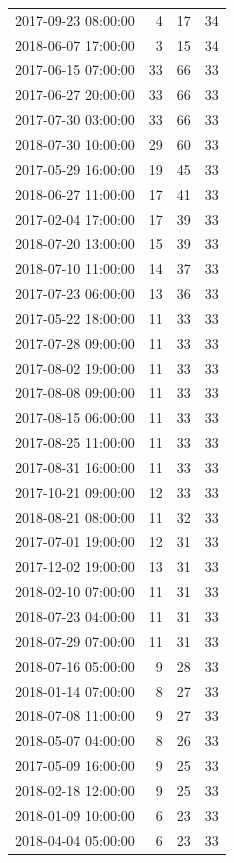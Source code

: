 \begin{tabular}{lrrr}
2017-09-23 08:00:00 & 4 & 17 & 34 \\
2018-06-07 17:00:00 & 3 & 15 & 34 \\
2017-06-15 07:00:00 & 33 & 66 & 33 \\
2017-06-27 20:00:00 & 33 & 66 & 33 \\
2017-07-30 03:00:00 & 33 & 66 & 33 \\
2018-07-30 10:00:00 & 29 & 60 & 33 \\
2017-05-29 16:00:00 & 19 & 45 & 33 \\
2018-06-27 11:00:00 & 17 & 41 & 33 \\
2017-02-04 17:00:00 & 17 & 39 & 33 \\
2018-07-20 13:00:00 & 15 & 39 & 33 \\
2018-07-10 11:00:00 & 14 & 37 & 33 \\
2017-07-23 06:00:00 & 13 & 36 & 33 \\
2017-05-22 18:00:00 & 11 & 33 & 33 \\
2017-07-28 09:00:00 & 11 & 33 & 33 \\
2017-08-02 19:00:00 & 11 & 33 & 33 \\
2017-08-08 09:00:00 & 11 & 33 & 33 \\
2017-08-15 06:00:00 & 11 & 33 & 33 \\
2017-08-25 11:00:00 & 11 & 33 & 33 \\
2017-08-31 16:00:00 & 11 & 33 & 33 \\
2017-10-21 09:00:00 & 12 & 33 & 33 \\
2018-08-21 08:00:00 & 11 & 32 & 33 \\
2017-07-01 19:00:00 & 12 & 31 & 33 \\
2017-12-02 19:00:00 & 13 & 31 & 33 \\
2018-02-10 07:00:00 & 11 & 31 & 33 \\
2018-07-23 04:00:00 & 11 & 31 & 33 \\
2018-07-29 07:00:00 & 11 & 31 & 33 \\
2018-07-16 05:00:00 & 9 & 28 & 33 \\
2018-01-14 07:00:00 & 8 & 27 & 33 \\
2018-07-08 11:00:00 & 9 & 27 & 33 \\
2018-05-07 04:00:00 & 8 & 26 & 33 \\
2017-05-09 16:00:00 & 9 & 25 & 33 \\
2018-02-18 12:00:00 & 9 & 25 & 33 \\
2018-01-09 10:00:00 & 6 & 23 & 33 \\
2018-04-04 05:00:00 & 6 & 23 & 33 \\

\end{tabular}

